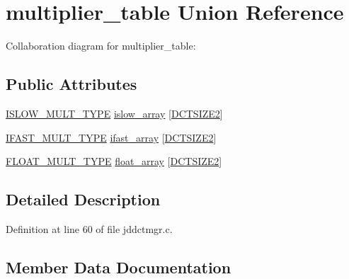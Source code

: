 \hypertarget{unionmultiplier__table}{}\section{multiplier\+\_\+table Union Reference}
\label{unionmultiplier__table}


Collaboration diagram for multiplier\+\_\+table\+:
\subsection*{Public Attributes}
\begin{DoxyCompactItemize}
\item 
\mbox{\hyperlink{jdct_8h_a057ec4d475bf55bf8e28a146c8d9bce1}{I\+S\+L\+O\+W\+\_\+\+M\+U\+L\+T\+\_\+\+T\+Y\+PE}} \mbox{\hyperlink{unionmultiplier__table_a8585c9759405a74e7cbd4d6b3f8da073}{islow\+\_\+array}} \mbox{[}\mbox{\hyperlink{jpeglib_8h_af89dff4200396563157d4a1e59da3bdf}{D\+C\+T\+S\+I\+Z\+E2}}\mbox{]}
\item 
\mbox{\hyperlink{jdct_8h_a2ce5dea49d73b718b055db4d04b4a5a3}{I\+F\+A\+S\+T\+\_\+\+M\+U\+L\+T\+\_\+\+T\+Y\+PE}} \mbox{\hyperlink{unionmultiplier__table_a815932c92e5d7cea970c6cddb5bbf6f1}{ifast\+\_\+array}} \mbox{[}\mbox{\hyperlink{jpeglib_8h_af89dff4200396563157d4a1e59da3bdf}{D\+C\+T\+S\+I\+Z\+E2}}\mbox{]}
\item 
\mbox{\hyperlink{jdct_8h_ac3f02a81c5cd0fca588c66be99b42691}{F\+L\+O\+A\+T\+\_\+\+M\+U\+L\+T\+\_\+\+T\+Y\+PE}} \mbox{\hyperlink{unionmultiplier__table_a3867da0f271dbfd782ad1e1603e71e88}{float\+\_\+array}} \mbox{[}\mbox{\hyperlink{jpeglib_8h_af89dff4200396563157d4a1e59da3bdf}{D\+C\+T\+S\+I\+Z\+E2}}\mbox{]}
\end{DoxyCompactItemize}


\subsection{Detailed Description}


Definition at line 60 of file jddctmgr.\+c.



\subsection{Member Data Documentation}
\mbox{\label{unionmultiplier__table_a3867da0f271dbfd782ad1e1603e71e88}} 
